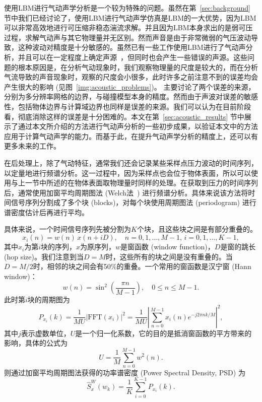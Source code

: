 使用LBM进行气动声学分析是一个较为特殊的问题。虽然在第~\ref{sec:background} 节中我们已经讨论了，使用LBM进行气动声学仿真是LBM的一大优势，因为LBM可以非常高效地进行可压缩非稳态湍流求解。并且因为LBM本身求出的是弱可压过程，求解气动声与其它物理量并无区别。然而声音是由于非常微弱的气压波动导致，这种波动对精度是十分敏感的。虽然已有一些工作使用LBM进行了气动声分析，并且可以在一定程度上确定声源~\cite{doi:10.2514/6.2013-2256, doi:10.2514/1.J052365, doi:10.2514/6.2015-2993}，但同时也会产生一些错误的声源。这些问题的根本原因是，在分析气动现象时，我们观察物理量的尺度是较大的，而在分析气流导致的声音现象时，观察的尺度会小很多，此时许多之前注意不到的误差均会产生很大的影响 (见图~\ref{img:acoustic_problems})。\citet{ASTOUL2020109645} 主要讨论了两个误差的来源，分别为多分辨率网格的边界，与碰撞模型本身的精度。然而由于声波对误差的敏感性，包括物体边界与计算域边界也同样是误差的来源。我们可以认为在目前阶段看，彻底消除这样的误差是十分困难的。本文在第~\ref{sec:acoustic_results} 节中展示了通过本文所介绍的方法进行气动声分析的一些初步成果，以验证本文中的方法应用于计算气动声学的能力。而基于此，在提升气动声学分析的精度上，还可以有更多未来的工作。

在后处理上，除了气动特征，通常我们还会记录某些采样点压力波动的时间序列，以定量地进行频谱分析。这一过程中，因为采样点也会位于物体表面，所以可以使用与上一节中所述的在物体表面取物理量时同样的处理。在获取到压力的时间序列后，通常使用加窗平均周期图法 (Welch法~\citep{1161901}) 进行频谱分析。具体来说该方法将时间信号序列分割成了多个块 (blocks)，对每个块使用周期图法 (periodogram) 进行谱密度估计后再进行平均。

具体来说，一个时间信号序列先被分割为$K$个块，且这些块之间是有部分重叠的。
\begin{equation}
  x_i(n) = w(n) \, x(n+i D), \quad n=0,1, \ldots, M-1, \, i=0,1, \ldots, K-1,
\end{equation}
其中$x_i$为第$i$块的序列，$x$为原序列，$w$是窗函数 (window function)，$D$是窗的跳长 (hop size)。我们注意到当$D=M$时，这些所有的块之间是没有重叠的。当$D=M/2$时，相邻的块之间会有50\%的重叠。一个常用的窗函数是汉宁窗 (Hann window)：
\begin{equation}
  w(n)=\sin^2 \left(\frac{\pi n}{M-1}\right), \quad 0 \leq n \leq M-1 .
\end{equation}
此时第$i$块的周期图为
\begin{equation}
  P_{x_i}\left(k\right)=\frac{1}{MU}\left|\mathrm{FFT}\left(x_i\right)\right|^2 = \frac{1}{MU}\left|\sum_{n=0}^{M-1} x_i(n) e^{-j 2 \pi n k / M}\right|^2,
\end{equation}
其中$j$表示虚数单位，$U$是一个归一化系数，它的目的是抵消窗函数的平方带来的影响，具体的公式为
\begin{equation}
  U=\frac{1}{M}\sum^{M-1}_{n=0} w^2(n).
\end{equation}
则通过加窗平均周期图法获得的功率谱密度 (Power Spectral Density, PSD) 为
\begin{equation}
  \hat{S}_x^W\left(w_k\right) = \frac{1}{K} \sum_{i=0}^{K-1} P_{x_i}\left(k\right).
\end{equation}